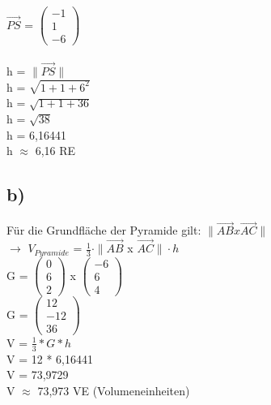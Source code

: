 \documentclass{article}
\begin{document}
	$\vec{PS}$ = 
	$\left(\begin{array}{c}
	-1 \\ 1 \\ -6
	\end{array}\right)$ \\ \\
	h = $\|\vec{PS}\|$ \\
	h = $\sqrt{1 + 1 + 6^2}$ \\
	h = $\sqrt{1 + 1 + 36}$ \\
	h = $\sqrt{38}$ \\
	h = 6,16441 \\
	h $\approx$ 6,16 RE
	\subsection*{b)}
	Für die Grundfläche der Pyramide gilt: $\|\vec{AB} x \vec{AC}\|$  \\
	$\to$ $V_{Pyramide}$ = $\frac{1}{3} \cdot \|\vec{AB}$ x $\vec{AC}\| \cdot h$ \\
	G = 
	$\left(\begin{array}{c}
	0 \\ 6 \\ 2
	\end{array}\right)$
	x
	$\left(\begin{array}{c}
	-6 \\ 6 \\ 4
	\end{array}\right)$ \\
	G = 
	$\left(\begin{array}{c}
	12 \\ -12 \\ 36
	\end{array}\right)$ \\
	V = $\frac{1}{3} * G * h$ \\
	V = 12 * 6,16441 \\
	V = 73,9729 \\
	V $\approx$ 73,973 VE (Volumeneinheiten)
\end{document}
